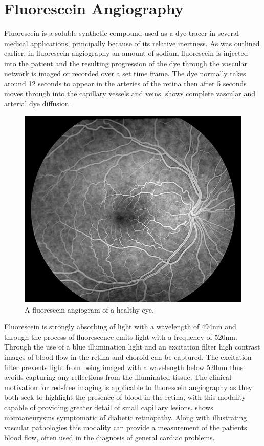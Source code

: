 \section{Fluorescein Angiography}

Fluorescein is a soluble synthetic compound used as a dye tracer in
several medical applications, principally because of its relative inertness.
As was outlined earlier, in fluorescein angiography an amount of sodium
fluorescein is injected into the patient and the resulting progression of the
dye through the vascular network is imaged or recorded over a set time
frame. The dye normally takes around 12 seconds to appear in the arteries
of the retina then after 5 seconds moves through into the capillary vessels
and veins.  shows complete vascular and arterial dye diffusion.

\begin{figure}[htbp]
\centering
\includegraphics{figures/fluoresceinangio}
\caption{A fluorescein angiogram of a healthy eye.}
\label{fig:fluor}
   \end{figure}

Fluorescein is strongly absorbing of light with a wavelength of 494nm and
through the process of fluorescence emits light with a frequency of 520nm.
Through the use of a blue illumination light and an excitation filter high
contrast images of blood flow in the retina and choroid can be captured.
The excitation filter prevents light from being imaged with a wavelength
below 520nm thus avoids capturing any reflections from the illuminated tissue.
\cite{demofluorescein} The clinical motivation for red-free imaging is applicable
to fluorescein angiography as they both seek to highlight the presence of blood
in the retina, with this modality capable of providing greater detail of small
capillary lesions,  shows microaneurysms symptomatic of diabetic
retinopathy. Along with illustrating vascular pathologies this modality can provide
a measurement of the patients blood flow, often used in the diagnosis of general
cardiac problems.

